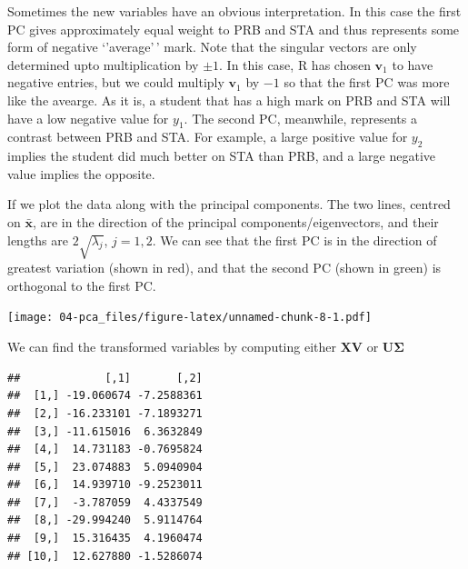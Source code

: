 \documentclass[
]{book}
\newenvironment{Shaded}{\begin{snugshade}}{\end{snugshade}}
\newcommand{\FunctionTok}[1]{\textcolor[rgb]{0.13,0.29,0.53}{\textbf{#1}}}
\newcommand{\NormalTok}[1]{#1}
\newcommand{\SpecialCharTok}[1]{\textcolor[rgb]{0.81,0.36,0.00}{\textbf{#1}}}
\theoremstyle{definition}
\theoremstyle{definition}
\theoremstyle{definition}
\theoremstyle{definition}
\theoremstyle{remark}
\begin{document}
Sometimes the new variables have an obvious interpretation. In this case the first PC gives approximately equal weight to PRB and STA and thus represents some form of negative `'average'\,' mark. Note that the singular vectors are only determined upto multiplication by \(\pm 1\). In this case, R has chosen \(\mathbf v_1\) to have negative entries, but we could multiply \(\mathbf v_1\) by \(-1\) so that the first PC was more like the avearge.
As it is, a student that has a high mark on PRB and STA will have a low negative value for \(y_1\). The second PC, meanwhile, represents a contrast between PRB and STA. For example, a large positive value for \(y_2\) implies the student did much better on STA than PRB, and a large negative value implies the opposite.

If we plot the data along with the principal components. The two lines, centred on \(\bar{\mathbf x}\), are in the direction of the principal components/eigenvectors, and their lengths are \(2 \sqrt{\lambda_j}\), \(j=1,2\).
We can see that the first PC is in the direction of greatest variation (shown in red), and that the second PC (shown in green) is orthogonal to the first PC.

\texttt{[image: 04-pca\_files/figure-latex/unnamed-chunk-8-1.pdf]}

We can find the transformed variables by computing either \(\mathbf X\mathbf V\) or \(\mathbf U\boldsymbol{\Sigma}\)

\begin{Shaded}
\end{Shaded}

\begin{verbatim}
##             [,1]       [,2]
##  [1,] -19.060674 -7.2588361
##  [2,] -16.233101 -7.1893271
##  [3,] -11.615016  6.3632849
##  [4,]  14.731183 -0.7695824
##  [5,]  23.074883  5.0940904
##  [6,]  14.939710 -9.2523011
##  [7,]  -3.787059  4.4337549
##  [8,] -29.994240  5.9114764
##  [9,]  15.316435  4.1960474
## [10,]  12.627880 -1.5286074
\end{verbatim}

\begin{Shaded}
\end{Shaded}
\end{document}
